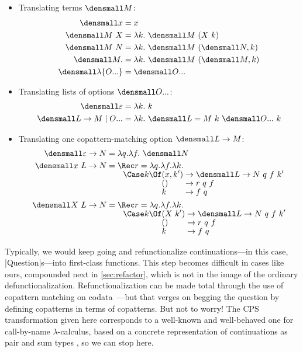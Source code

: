 \documentclass[sigplan,screen]{acmart}
\begin{document}
\begin{itemize}
\item  Translating terms $\den{M}$:
\begin{align*}
  \den{x} &= x
  \\
  \den{M~X} &= \lambda k.~ \den{M} ~ (X ~ k)
  \\
  \den{M~N} &= \lambda k.~ \den{M} ~ (\den{N}, k)
  \\
  \den{M.} &= \lambda k.~ \den{M} ~ (\den{M}, k)
  \\
  \den{\lambda\{\many{O}\}} &= \den{\many{O}}
\end{align*}
\item  Translating lists of options $\den{\many{O}}$:
\begin{align*}
  \den{\varepsilon} &= \lambda k.~ k
  \\
  \den{L \to M \mid \many{O}}
  &=
  \lambda k.~ \den{L = M} ~ k ~ \den{\many{O}} ~ k
\end{align*}
\item Translating one copattern-matching option $\den{L \to M}$:
\begin{align*}
  \den{\varepsilon \to N} &= \lambda q. \lambda f.~ \den{N}
  \\
  \den{x ~ L \to N} &= \Rec r = \lambda q. \lambda f. \lambda k.
  \\[-1ex]
  &\qquad
  \Case k \Of
  \begin{alignedat}[t]{2}
    &(x, k') &&\to \den{L \to N} ~ q ~ f ~ k'
    \\[-1ex]
    &() &&\to r ~ q ~ f
    \\[-1ex]
    &k &&\to f ~ q
  \end{alignedat}
  \\
  \den{X ~ L \to N} &= \Rec r = \lambda q. \lambda f. \lambda k.
  \\[-1ex]
  &\qquad
  \Case k \Of
  \begin{alignedat}[t]{2}
    &(X ~ k') &&\to \den{L \to N} ~ q ~ f ~ k'
    \\[-1ex]
    &() &&\to r ~ q ~ f
    \\[-1ex]
    &k &&\to f ~ q
  \end{alignedat}
\end{align*}
\end{itemize}

\begin{remark}
  Typically, we would keep going and refunctionalize continuations---in this
  case, \hs|Question|s---into first-class functions.  This step becomes
  difficult in cases like ours, compounded next in \cref{sec:refactor}, which is
  not in the image of the ordinary defunctionalization.  Refunctionalization can
  be made total through the use of copattern matching on
  codata~\cite{RefunctionalizationCopatterns}---but that verges on begging the
  question by defining copatterns in terms of copatterns.  But not to worry!
  The CPS transformation given here corresponds to a well-known and well-behaved
  one for call-by-name $\lambda$-calculus, based on a concrete representation of
  continuations as pair and sum types
  \cite{ContinuationModels,ClassicalLogicContinuationSemantics,CBNSyntacticCPS,AnswerTypePolyEta},
  so we can stop here.
\end{remark}
\end{document}
